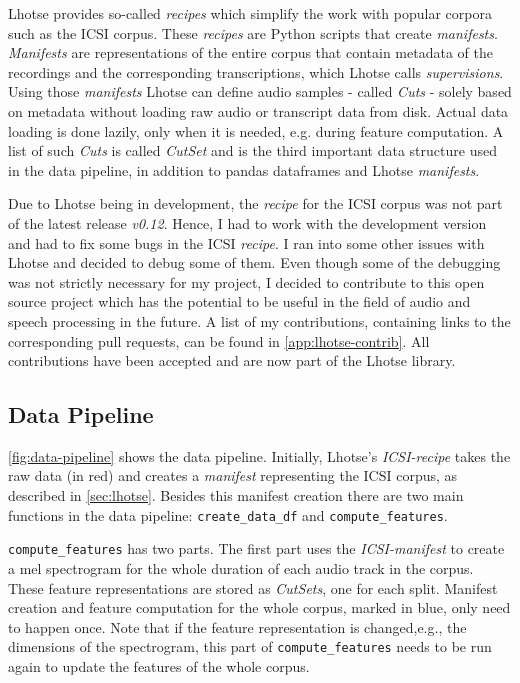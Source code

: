\documentclass[bsc,frontabs,parskip,deptreport]{infthesis}
\begin{document}
Lhotse provides so-called \textit{recipes} which simplify the work with popular corpora such as the ICSI corpus.
These \textit{recipes} are Python scripts that create \textit{manifests}.
\textit{Manifests} are representations of the entire corpus that contain metadata of the recordings and the corresponding transcriptions, which Lhotse calls \textit{supervisions}.
Using those \textit{manifests} Lhotse can define audio samples - called \textit{Cuts} - solely based on metadata without loading raw audio or transcript data from disk. Actual data loading is done lazily, only when it is needed, e.g. during feature computation. 
A list of such \textit{Cuts} is called \textit{CutSet} and is the third important data structure used in the data pipeline, in addition to pandas dataframes and Lhotse \textit{manifests}. 

Due to Lhotse being in development, the \textit{recipe} for the ICSI corpus was not part of the latest release \textit{v0.12}. Hence, I had to work with the development version and had to fix some bugs in the ICSI \textit{recipe}. 
I ran into some other issues with Lhotse and decided to debug some of them. Even though some of the debugging was not strictly necessary for my project, I decided to contribute to this open source project which has the potential to be useful in the field of audio and speech processing in the future. A list of my contributions, containing links to the corresponding pull requests, can be found in \autoref{app:lhotse-contrib}. All contributions have been accepted and are now part of the Lhotse library.

\subsection{Data Pipeline} \label{sec:ml-data-pipeline}

\autoref{fig:data-pipeline} shows the data pipeline.
Initially, Lhotse's \textit{ICSI-recipe} takes the raw data (in red) and creates a \textit{manifest} representing the ICSI corpus, as described in \autoref{sec:lhotse}.
Besides this manifest creation there are two main functions in the data pipeline: \verb|create_data_df| and \verb|compute_features|.

\verb|compute_features| has two parts.
The first part uses the \textit{ICSI-manifest} to create a mel spectrogram for the whole duration of each audio track in the corpus. These feature representations are stored as \textit{CutSets}, one for each split.
Manifest creation and feature computation for the whole corpus, marked in blue, only need to happen once.
Note that if the feature representation is changed,e.g., the dimensions of the spectrogram, this part of \verb|compute_features| needs to be run again to update the features of the whole corpus.
\end{document}
